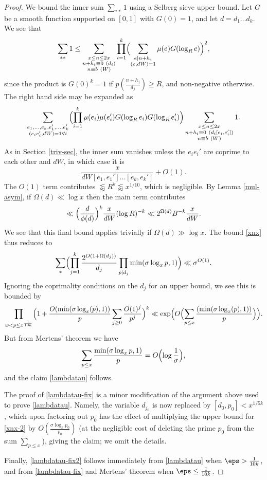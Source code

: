 \begin{proof}
We bound the inner sum $\sum_{**} 1$  using a Selberg sieve upper bound. Let $G$ be a smooth  function supported on $[0,1]$ with $G(0)=1$, and let $d=d_1\dots d_k$. We see that
$$\sum_{**} 1\le \sum_{\substack{x\le n\le 2x\\ n+h_i\equiv 0\ (d_i) \\ n\equiv b\ (W)}}\prod_{i=1}^k\Bigl(\sum_{\substack{e|n+h_i\\ (e,dW)=1}}\mu(e)G(\log_R{e})\Bigr)^2,$$
since the product is $G(0)^k=1$ if $p( \frac{n+h_j}{d_j}) \geq R$, and non-negative otherwise. The right hand side may be expanded as
$$ \sum_{\substack{e_1,\dots,e_k,e_1',\dots,e_k'\\ (e_ie_i',dW)=1\forall i}}\Bigl(\prod_{i=1}^k\mu(e_i)\mu(e_i')G(\log_R{e_i})G(\log_R{e_i'})\Bigr)\sum_{\substack{x\le n\le 2x \\ n+h_i\equiv 0\ (d_i[e_i,e_i']) \\ n\equiv b\ (W)}}1.$$
As in Section \ref{triv-sec}, the inner sum vanishes unless the $e_ie_i'$ are coprime to each other and $dW$, in which case it is
$$\frac{x}{dW[e_1,e_1']\dots [e_k,e_k']}+O(1).$$
The $O(1)$ term contributes $\lessapprox R^k\lessapprox x^{1/10}$, which is negligible. By Lemma \ref{mul-asym}, if $\Omega(d)\ll \log{x}$ then the main term contributes
$$\ll \Bigl(\frac{d}{\phi(d)}\Bigr)^k\frac{x}{d W}(\log{R})^{-k}\ll 2^{\Omega(d)}B^{-k}\frac{x}{d W}.$$
We see that this final bound applies trivially if $\Omega(d)\gg \log{x}$. The bound \eqref{xnx} thus reduces to
\begin{equation}\label{xnx-2}
\sum_* \Bigl(\prod_{j=1}^k \frac{2^{O(1+\Omega(d_j))}}{d_j} \prod_{p|d_j} \min( \sigma \log_x p, 1 )\Bigr) \ll \sigma^{O(1)}.
\end{equation}
Ignoring the coprimality conditions on the $d_j$ for an upper bound, we see this is bounded by
$$ \prod_{w<p\le x^{\frac{1}{10k}}}\Bigl(1+\frac{O(\min(\sigma\log_x(p),1))}{p}\sum_{j\ge 0}\frac{O(1)^j}{p^j}\Bigr)^k \ll \exp\Bigl(O\Bigl(\sum_{p\le x}\frac{(\min(\sigma\log_x(p),1))}{p}\Bigr)\Bigr).$$
But from Mertens' theorem we have
$$ \sum_{p \leq x} \frac{\min(\sigma \log_x p, 1)}{p} = O\Bigl( \log \frac{1}{\sigma} \Bigr),$$
and the claim \eqref{lambdatau} follows.

The proof of \eqref{lambdatau-fix} is a minor modification of the argument above used to prove \eqref{lambdatau}.  
Namely, the variable $d_{j_0}$ is now replaced by $[d_0,p_0]<x^{1/5k}$, which upon factoring out $p_0$ has the effect of multiplying the upper bound for \eqref{xnx-2} by $O( \frac{\sigma \log_x p_0}{p_0})$ (at the negligible cost of deleting the prime $p_0$ from the sum $\sum_{p \leq x}$), giving the claim; we omit the details.

Finally, \eqref{lambdatau-fix2} follows immediately from \eqref{lambdatau} when $\eps > \frac{1}{10k}$, and from \eqref{lambdatau-fix} and Mertens' theorem when $\eps \leq \frac{1}{10k}$.
\end{proof}


